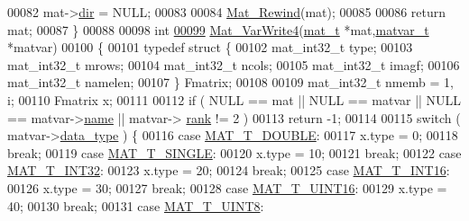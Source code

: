 \begin{DoxyCode}
{00082     mat->\hyperlink{struct__mat__t_a1bc6c604459d0787801d5e53d365684c}{dir}           = NULL;
00083 
00084     \hyperlink{group___m_a_t_ga4d6e3892d2e216c507a744ba0e070d0b}{Mat\_Rewind}(mat);
00085 
00086     \textcolor{keywordflow}{return} mat;
00087 \}
00088 
00098 \textcolor{keywordtype}{int}
\hyperlink{mat4_8c_aa19d44f9375c3f316de3c288642b42c3}{00099} \hyperlink{mat4_8c_aa19d44f9375c3f316de3c288642b42c3}{Mat\_VarWrite4}(\hyperlink{struct__mat__t}{mat\_t} *mat,\hyperlink{group___m_a_t_structmatvar__t}{matvar\_t} *matvar)
00100 \{
00101     \textcolor{keyword}{typedef} \textcolor{keyword}{struct }\{
00102         mat\_int32\_t type;
00103         mat\_int32\_t mrows;
00104         mat\_int32\_t ncols;
00105         mat\_int32\_t imagf;
00106         mat\_int32\_t namelen;
00107     \} Fmatrix;
00108 
00109     mat\_int32\_t nmemb = 1, i;
00110     Fmatrix x;
00111 
00112     \textcolor{keywordflow}{if} ( NULL == mat || NULL == matvar || NULL == matvar->\hyperlink{group___m_a_t_a5d4b55b041e3b4fb50c04337f05ad909}{name} || matvar->
      \hyperlink{group___m_a_t_a84ba70c96ded13cc555fa75b768d9921}{rank} != 2 )
00113         \textcolor{keywordflow}{return} -1;
00114 
00115     \textcolor{keywordflow}{switch} ( matvar->\hyperlink{group___m_a_t_ab6aafe9bd77f0f077852593dec438144}{data\_type} ) \{
00116         \textcolor{keywordflow}{case} \hyperlink{group___m_a_t_ggacf7b3b879282b7ab3a51190e49bf3453a31e721ecf7e188196f83c32838288797}{MAT\_T\_DOUBLE}:
00117             x.type = 0;
00118             \textcolor{keywordflow}{break};
00119         \textcolor{keywordflow}{case} \hyperlink{group___m_a_t_ggacf7b3b879282b7ab3a51190e49bf3453a3a3657d40e9212c923d9b9d03531b64c}{MAT\_T\_SINGLE}:
00120             x.type = 10;
00121             \textcolor{keywordflow}{break};
00122         \textcolor{keywordflow}{case} \hyperlink{group___m_a_t_ggacf7b3b879282b7ab3a51190e49bf3453a83e06a68320726c6572bfbb9f3addb1d}{MAT\_T\_INT32}:
00123             x.type = 20;
00124             \textcolor{keywordflow}{break};
00125         \textcolor{keywordflow}{case} \hyperlink{group___m_a_t_ggacf7b3b879282b7ab3a51190e49bf3453a8c5b2e381946e95ea8d81ac216743302}{MAT\_T\_INT16}:
00126             x.type = 30;
00127             \textcolor{keywordflow}{break};
00128         \textcolor{keywordflow}{case} \hyperlink{group___m_a_t_ggacf7b3b879282b7ab3a51190e49bf3453a05bc7af7680aa68be95126ae0a4c2e31}{MAT\_T\_UINT16}:
00129             x.type = 40;
00130             \textcolor{keywordflow}{break};
00131         \textcolor{keywordflow}{case} \hyperlink{group___m_a_t_ggacf7b3b879282b7ab3a51190e49bf3453a01c1bd7db68f90552862eb5d311be408}{MAT\_T\_UINT8}:
}
\end{DoxyCode}
